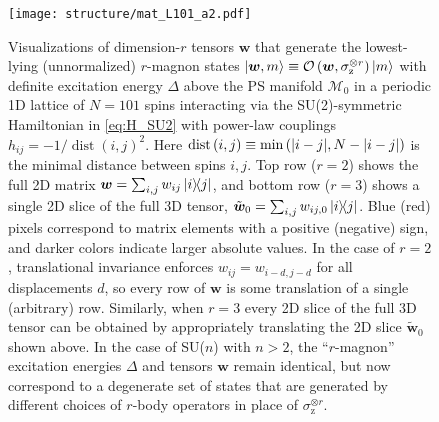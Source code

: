 \documentclass[nofootinbib,notitlepage,11pt]{revtex4-2}
\newcommand{\p}[1]{\left(#1\right)} %
\newcommand{\m}{\bm} %
\newcommand{\1}{\mathds{1}}
\newcommand{\z}{\text{z}}
\newcommand{\M}{\mathcal{M}}
\renewcommand{\O}{\mathcal{O}}
\newcommand{\oper}{\operatorname}
\begin{document}
\begin{figure}
  \centering
  \texttt{[image: structure/mat\_L101\_a2.pdf]}
  \caption{Visualizations of dimension-$r$ tensors $\m w$ that
    generate the lowest-lying (unnormalized) $r$-magnon states
    $\ket{\m w,m} \equiv \O\p{\m w, \sigma_\z^{\otimes{r}}} \ket{m}$
    with definite excitation energy $\Delta$ above the PS manifold
    $\M_0$ in a periodic 1D lattice of $N=101$ spins interacting via
    the SU(2)-symmetric Hamiltonian in \eqref{eq:H_SU2} with power-law
    couplings $h_{ij}=-1/\oper{dist}\p{i,j}^2$.  Here
    $\oper{dist}\p{i,j}\equiv\min\p{\abs{i-j},N-\abs{i-j}}$ is the
    minimal distance between spins $i,j$.  Top row ($r=2$) shows the
    full 2D matrix $\m w = \sum_{i,j}w_{ij}\op{i}{j}$, and bottom row
    ($r=3$) shows a single 2D slice of the full 3D tensor,
    $\tilde{\m w}_0 = \sum_{i,j}w_{ij,0}\op{i}{j}$.  Blue (red) pixels
    correspond to matrix elements with a positive (negative) sign, and
    darker colors indicate larger absolute values.  In the case of
    $r=2$, translational invariance enforces $w_{ij}=w_{i-d,j-d}$ for
    all displacements $d$, so every row of $\m w$ is some translation
    of a single (arbitrary) row.  Similarly, when $r=3$ every 2D slice
    of the full 3D tensor can be obtained by appropriately translating
    the 2D slice $\tilde{\m w}_0$ shown above.  In the case of SU($n$)
    with $n>2$, the ``$r$-magnon'' excitation energies $\Delta$ and
    tensors $\m w$ remain identical, but now correspond to a
    degenerate set of states that are generated by different choices
    of $r$-body operators in place of $\sigma_\z^{\otimes r}$.}
  \label{fig:structure}
\end{figure}

\end{document}
